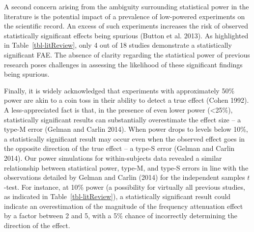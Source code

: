 \documentclass[
]{interact}
\begin{document}
A second concern arising from the ambiguity surrounding statistical
power in the literature is the potential impact of a prevalence of
low-powered experiments on the scientific record. An excess of such
experiments increases the risk of observed statistically significant
effects being spurious (Button et al. 2013). As highlighted in
Table~\ref{tbl-litReview}, only 4 out of 18 studies demonstrate a
statistically significant FAE. The absence of clarity regarding the
statistical power of previous research poses challenges in assessing the
likelihood of these significant findings being spurious.

Finally, it is widely acknowledged that experiments with approximately
50\% power are akin to a coin toss in their ability to detect a true
effect (Cohen 1992). A less-appreciated fact is that, in the presence of
even lower power (\textless25\%), statistically significant results can
substantially overestimate the effect size -- a type-M error (Gelman and
Carlin 2014). When power drops to levels below 10\%, a statistically
significant result may occur even when the observed effect goes in the
opposite direction of the true effect -- a type-S error (Gelman and
Carlin 2014). Our power simulations for within-subjects data revealed a
similar relationship between statistical power, type-M, and type-S
errors in line with the observations detailed by Gelman and Carlin
(2014) for the independent samples \(t\)-test. For instance, at 10\%
power (a possibility for virtually all previous studies, as indicated in
Table~\ref{tbl-litReview}), a statistically significant result could
indicate an overestimation of the magnitude of the frequency attenuation
effect by a factor between 2 and 5, with a 5\% chance of incorrectly
determining the direction of the effect.
\end{document}
